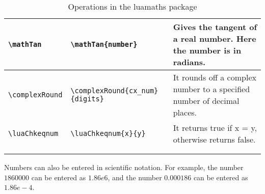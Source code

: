 \documentclass{article}
\begin{document}
\begin{center}
\begin{longtable}{llm{6.5cm}}
\begin{lstlisting}
\mathTan
\end{lstlisting} &
\begin{lstlisting}
\mathTan{number}
\end{lstlisting} & Gives the tangent of a real number. Here the number is in radians.\\
\midrule
\begin{lstlisting}
\complexRound
\end{lstlisting} &
\begin{lstlisting}
\complexRound{cx_num}{digits}
\end{lstlisting} & It rounds off a complex number to a specified number of decimal places.\\
\midrule
\begin{lstlisting}
\luaChkeqnum
\end{lstlisting} &
\begin{lstlisting}
\luaChkeqnum{x}{y}
\end{lstlisting} & It returns true if x = y, otherwise returns false.\\


\bottomrule \\
\caption{Operations in the luamaths package}
\label{tbl:opluamaths}
\end{longtable}
\end{center}
Numbers can also be entered in scientific notation. For example, the number \(1860000\) can be entered as \(1.86e6\), and the number \(0.000186\) can be entered as \(1.86e-4\).
\end{document}
